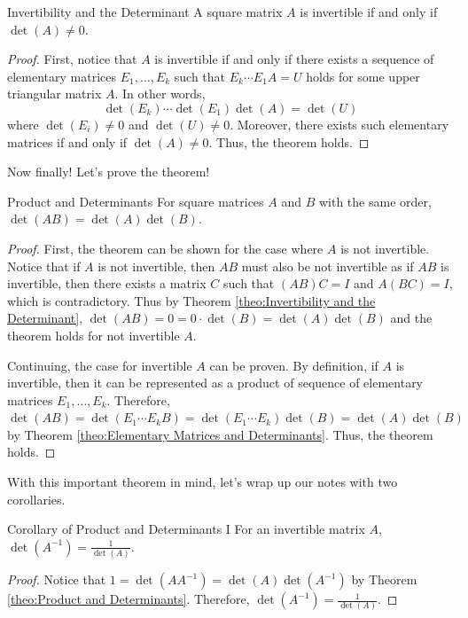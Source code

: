 \documentclass[../../../main.tex]{subfiles}
\begin{document}
\begin{theorem}{}{Invertibility and the Determinant}
A square matrix $A$ is invertible if and only if $\det(A) \neq 0$.
\end{theorem}
\begin{proof}
First, notice that $A$ is invertible if and only if there exists a
sequence of elementary matrices $E_1, \ldots, E_k$ such that
$E_k \cdots E_1 A = U$ holds for some upper triangular matrix $A$.
In other words,
\[
\det(E_k) \cdots \det(E_1) \det(A) = \det(U)
\]
where $\det(E_i) \neq 0$ and $\det(U) \neq 0$. Moreover, there exists
such elementary matrices if and only if $\det(A) \neq 0$. Thus, the
theorem holds.
\end{proof}

Now finally! Let's prove the theorem!

\begin{theorem}{}{Product and Determinants}
For square matrices $A$ and $B$ with the same order, $\det(AB) =
\det(A) \det(B)$.
\end{theorem}
\begin{proof}
First, the theorem can be shown for the case where $A$ is not
invertible. Notice that if $A$ is not invertible, then $AB$
must also be not invertible as if $AB$ is invertible, then
there exists a matrix $C$ such that $(AB)C = I$ and $A(BC) = I$,
which is contradictory. Thus by Theorem \ref{theo:Invertibility and
the Determinant}, $\det(AB) = 0 = 0 \cdot \det(B) = \det(A) \det(B)$
and the theorem holds for not invertible $A$.

Continuing, the case for invertible $A$ can be proven. By definition,
if $A$ is invertible, then it can be represented as a product of
sequence of elementary matrices $E_1, \ldots, E_k$. Therefore,
$\det(AB) = \det(E_1 \cdots E_k B) = \det(E_1 \cdots E_k) \det(B) =
\det(A) \det(B)$ by Theorem \ref{theo:Elementary Matrices and
Determinants}. Thus, the theorem holds.
\end{proof}

With this important theorem in mind, let's wrap up our notes with
two corollaries.

\begin{corollary}{}{Corollary of Product and Determinants I}
For an invertible matrix $A$, $\det(A^{-1}) = \frac{1}{\det(A)}$.
\end{corollary}
\begin{proof}
Notice that $1 = \det(AA^{-1}) = \det(A) \det(A^{-1})$ by Theorem
\ref{theo:Product and Determinants}. Therefore, $\det(A^{-1}) =
\frac{1}{\det(A)}$.
\end{proof}
\end{document}
